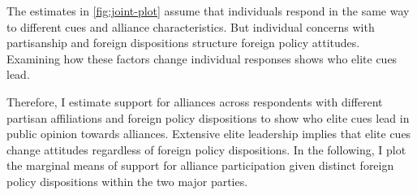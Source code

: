 \documentclass[12pt]{article}
\begin{document}
%
%
%
%


The estimates in \autoref{fig:joint-plot} assume that individuals respond in the same way to different cues and alliance characteristics. 
But individual concerns with partisanship and foreign dispositions structure foreign policy attitudes.
Examining how these factors change individual responses shows who elite cues lead.  






Therefore, I estimate support for alliances across respondents with different partisan affiliations and foreign policy dispositions to show who elite cues lead in public opinion towards alliances. 
Extensive elite leadership implies that elite cues change attitudes regardless of foreign policy dispositions. 
In the following, I plot the marginal means of support for alliance participation given distinct foreign policy dispositions within the two major parties.  
\end{document}
